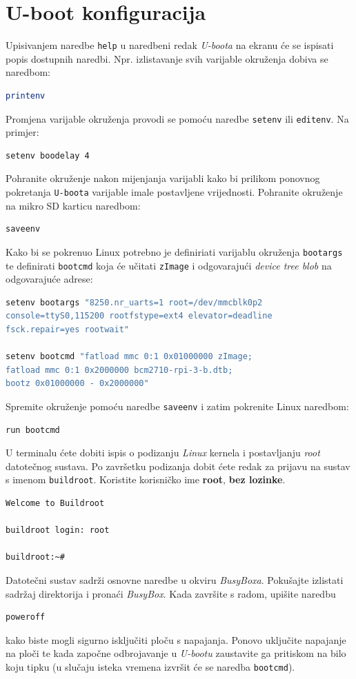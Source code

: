 \documentclass[11pt]{article}
\begin{document}
\section{U-boot konfiguracija}
Upisivanjem naredbe \texttt{help} u naredbeni redak \textit{U-boota} na ekranu
 će se ispisati popis dostupnih naredbi. Npr. izlistavanje svih varijable
 okruženja dobiva se naredbom:
\begin{lstlisting}[language=bash]
printenv
\end{lstlisting}
Promjena varijable okruženja provodi se pomoću naredbe \texttt{setenv} ili
 \texttt{editenv}. Na primjer:
\begin{lstlisting}[language=bash]
setenv boodelay 4
\end{lstlisting}
Pohranite okruženje nakon mijenjanja varijabli kako bi prilikom ponovnog
 pokretanja \texttt{U-boota} varijable imale postavljene vrijednosti. Pohranite
 okruženje na mikro SD karticu naredbom:
\begin{lstlisting}[language=bash]
saveenv
\end{lstlisting}
Kako bi se pokrenuo Linux potrebno je definiriati varijablu okruženja
 \texttt{bootargs} te definirati \texttt{bootcmd} koja će učitati
 \texttt{zImage} i odgovarajući \textit{device tree blob} na odgovarajuće
 adrese:
\begin{lstlisting}[language=bash]
setenv bootargs "8250.nr_uarts=1 root=/dev/mmcblk0p2
console=ttyS0,115200 rootfstype=ext4 elevator=deadline
fsck.repair=yes rootwait"

setenv bootcmd "fatload mmc 0:1 0x01000000 zImage;
fatload mmc 0:1 0x2000000 bcm2710-rpi-3-b.dtb;
bootz 0x01000000 - 0x2000000"
\end{lstlisting}
Spremite okruženje pomoću naredbe \texttt{saveenv} i zatim pokrenite Linux
 naredbom:
\begin{lstlisting}[language=bash]
run bootcmd
\end{lstlisting}
U terminalu ćete dobiti ispis o podizanju \textit{Linux} kernela i postavljanju
 \textit{root} datotečnog sustava. Po završetku podizanja dobit ćete redak za
 prijavu na sustav s imenom \texttt{buildroot}. Koristite korisničko ime
 \textbf{root}, \textbf{bez lozinke}.
\begin{lstlisting}[language=bash]
Welcome to Buildroot

buildroot login: root

buildroot:~#
\end{lstlisting}
Datotečni sustav sadrži osnovne naredbe u okviru \textit{BusyBoxa}. Pokušajte
 izlistati sadržaj direktorija i pronaći \textit{BusyBox}. Kada završite s
 radom, upišite naredbu
\begin{lstlisting}[language=bash]
poweroff
\end{lstlisting}
kako biste mogli sigurno isključiti ploču s napajanja. Ponovo uključite
 napajanje na ploči te kada započne odbrojavanje u \textit{U-bootu} zaustavite
 ga pritiskom na bilo koju tipku (u slučaju isteka vremena izvršit će se
 naredba \texttt{bootcmd}).
\end{document}
